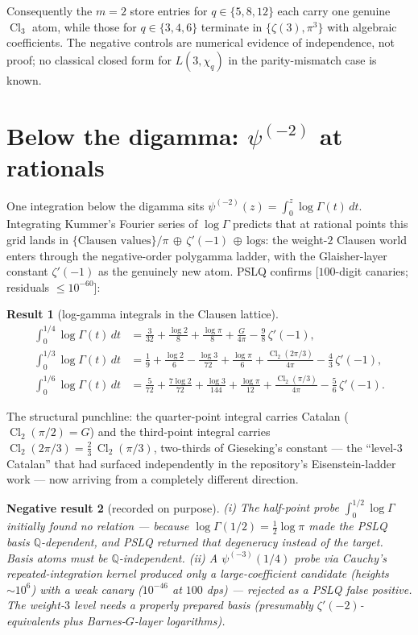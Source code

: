 \documentclass[11pt]{article}
\newtheorem{result}{Result}[section]
\newtheorem{negative}[result]{Negative result}
\theoremstyle{remark}
\newcommand{\Cl}{\operatorname{Cl}}
\newcommand{\Catalan}{G}
\newcommand{\dps}[1]{\textsf{\footnotesize[#1]}}
\begin{document}
Consequently the $m=2$ store entries for $q\in\{5,8,12\}$ each carry one genuine $\Cl_3$
atom, while those for $q\in\{3,4,6\}$ terminate in $\{\zeta(3),\pi^3\}$ with algebraic
coefficients. The negative controls are numerical evidence of independence, not proof; no
classical closed form for $L(3,\chi_q)$ in the parity-mismatch case is known.

\section{Below the digamma: \texorpdfstring{$\psi^{(-2)}$}{psi(-2)} at rationals}
\label{sec:psim2}

One integration below the digamma sits $\psi^{(-2)}(z)=\int_0^z\log\Gamma(t)\,dt$.
Integrating Kummer's Fourier series of $\log\Gamma$ \cite{Kummer} predicts that at rational points this
grid lands in $\{\text{Clausen values}\}/\pi\,\oplus\,\zeta'(-1)\,\oplus\,\text{logs}$:
the weight-$2$ Clausen world enters through the negative-order polygamma ladder, with the
Glaisher-layer constant $\zeta'(-1)$ as the genuinely new atom. PSLQ confirms
\dps{$100$-digit canaries; residuals $\le10^{-60}$}:

\begin{result}[log-gamma integrals in the Clausen lattice]\label{res:loggamma}
\begin{align*}
\int_0^{1/4}\log\Gamma(t)\,dt
&=\frac{3}{32}+\frac{\log2}{8}+\frac{\log\pi}{8}
+\frac{\Catalan}{4\pi}-\frac{9}{8}\,\zeta'(-1),\\[4pt]
\int_0^{1/3}\log\Gamma(t)\,dt
&=\frac{1}{9}+\frac{\log2}{6}-\frac{\log3}{72}+\frac{\log\pi}{6}
+\frac{\Cl_2(2\pi/3)}{4\pi}-\frac{4}{3}\,\zeta'(-1),\\[4pt]
\int_0^{1/6}\log\Gamma(t)\,dt
&=\frac{5}{72}+\frac{7\log2}{72}+\frac{\log3}{144}+\frac{\log\pi}{12}
+\frac{\Cl_2(\pi/3)}{4\pi}-\frac{5}{6}\,\zeta'(-1).
\end{align*}
\end{result}

The structural punchline: the quarter-point integral carries Catalan
($\Cl_2(\pi/2)=\Catalan$) and the third-point integral carries
$\Cl_2(2\pi/3)=\tfrac23\,\Cl_2(\pi/3)$, two-thirds of Gieseking's constant --- the
``level-3 Catalan'' that had surfaced independently in the
repository's Eisenstein-ladder work --- now arriving from a completely different direction.

\begin{negative}[recorded on purpose]\label{neg:psim2}
(i) The half-point probe $\int_0^{1/2}\log\Gamma$ initially found no relation --- because
$\log\Gamma(1/2)=\tfrac12\log\pi$ made the PSLQ basis $\mathbb{Q}$-dependent, and PSLQ
returned that degeneracy instead of the target. Basis atoms must be
$\mathbb{Q}$-independent. (ii) A $\psi^{(-3)}(1/4)$ probe via Cauchy's repeated-integration
kernel produced only a large-coefficient candidate (heights $\sim10^6$) with a weak canary
($10^{-46}$ at $100$ dps) --- \emph{rejected} as a PSLQ false positive. The weight-$3$
level needs a properly prepared basis (presumably $\zeta'(-2)$-equivalents plus
Barnes-$G$-layer logarithms).
\end{negative}
\end{document}
